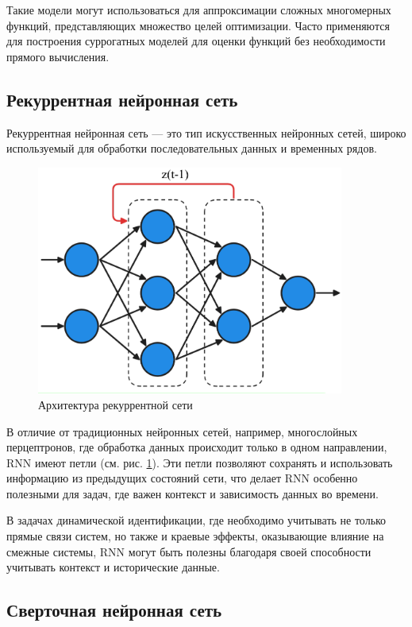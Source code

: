 Такие модели могут использоваться для аппроксимации сложных многомерных
функций, представляющих множество целей оптимизации. Часто применяются для
построения суррогатных моделей для оценки функций без необходимости прямого
вычисления.

\subsection{Рекуррентная нейронная сеть}

Рекуррентная нейронная сеть — это тип искусственных нейронных сетей, широко
используемый для обработки последовательных данных и временных рядов. 

\begin{figure}[H]
  \centering
    \includegraphics[width=0.9\textwidth]{figures/arch_rnn.png}
  \caption{Архитектура рекуррентной сети}\label{fig:rnn}
\end{figure}

В отличие от традиционных нейронных сетей, например, многослойных перцептронов, где
обработка данных происходит только в одном направлении, RNN имеют петли (см.
рис. \ref{fig:rnn}). Эти петли позволяют сохранять и использовать информацию из 
предыдущих состояний сети, что делает RNN особенно полезными для задач, где важен 
контекст и зависимость данных во времени. 

В задачах динамической идентификации, где необходимо учитывать не только прямые
связи систем, но также и краевые эффекты, оказывающие влияние на смежные
системы, RNN могут быть полезны благодаря своей способности учитывать контекст
и исторические данные.

\subsection{Сверточная нейронная сеть}

